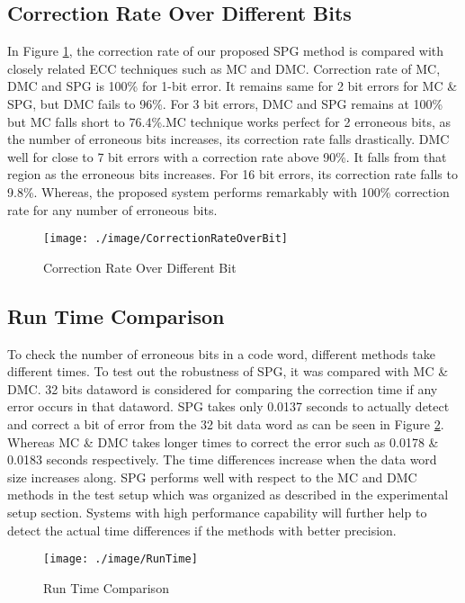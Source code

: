\documentclass[12pt,a4paper]{report}
\begin{document}
\subsection{Correction Rate Over Different Bits}
In Figure \ref{fig:CorrectionRateOverBit}, the correction rate of our proposed SPG method is compared with closely related ECC techniques such as MC and DMC. Correction rate of MC, DMC and SPG is 100\% for 1-bit error. It remains same for 2 bit errors for MC \& SPG, but DMC fails to 96\%. For 3 bit errors, DMC and SPG remains at 100\% but MC falls short to 76.4\%.MC technique works perfect for 2 erroneous bits, as the number of erroneous bits increases, its correction rate falls drastically. DMC well for close to 7 bit errors with a correction rate above 90\%. It falls from that region as the erroneous bits increases. For 16 bit errors, its correction rate falls to 9.8\%. Whereas, the proposed system performs remarkably with 100\% correction rate for any number of erroneous bits.

 \begin{figure}[!ht]
 \centering
 \texttt{[image: ./image/CorrectionRateOverBit]}
 \caption{Correction Rate Over Different Bit}
 \label{fig:CorrectionRateOverBit}
 \end{figure}

\subsection{Run Time Comparison}
To check the number of erroneous bits in a code word, different methods take different times. To test out the robustness of SPG, it was compared with MC \& DMC. 32 bits dataword is considered for comparing the correction time if any error occurs in that dataword. SPG takes only 0.0137 seconds to actually detect and correct a bit of error from the 32 bit data word as can be seen in Figure \ref{fig:RunTime}. \\

Whereas MC \& DMC takes longer times to correct the error such as 0.0178 \& 0.0183 seconds respectively. The time differences increase when the data word size increases along. SPG performs well with respect to the MC and DMC methods in the test setup which was organized as described in the experimental setup section. Systems with high performance capability will further help to detect the actual time differences if the methods with better precision.

\begin{figure}
 \centering
 \texttt{[image: ./image/RunTime]}
 \caption{Run Time Comparison}
 \label{fig:RunTime}
 \end{figure}
\end{document}
